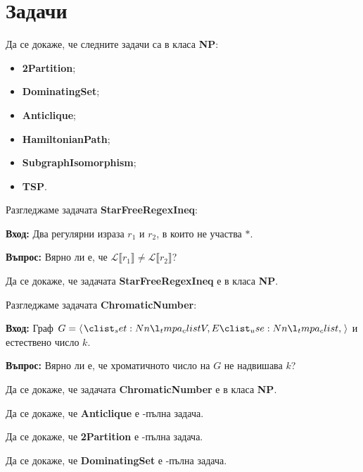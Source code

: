 \section{Задачи}

\begin{problem}
Да се докаже, че следните задачи са в класа \textbf{NP}:
\begin{itemize}
    \item \textbf{2Partition};
    \item \textbf{DominatingSet};
    \item \textbf{Anticlique};
    \item \textbf{HamiltonianPath};
    \item \textbf{SubgraphIsomorphism};
    \item \textbf{TSP}.
\end{itemize}
\end{problem}

\begin{problem}
Разгледжаме задачата \textbf{StarFreeRegexIneq}:

\vspace*{2mm}
\textbf{Вход:} Два регулярни израза $r_1$ и $r_2$, в които не участва $*$.

\textbf{Въпрос:} Вярно ли е, че $\mathcal{L}\llbracket r_1 \rrbracket \neq \mathcal{L}\llbracket r_2 \rrbracket$?
\vspace*{2mm}

Да се докаже, че задачата \textbf{StarFreeRegexIneq} е в класа \textbf{NP}.
\end{problem}

\begin{problem}
Разгледжаме задачата \textbf{ChromaticNumber}:

\vspace*{2mm}
\textbf{Вход:} Граф $G = \opair{V, E}$ и естествено число $k$.

\textbf{Въпрос:} Вярно ли е, че хроматичното число на $G$ не надвишава $k$?
\vspace*{2mm}

Да се докаже, че задачата \textbf{ChromaticNumber} е в класа \textbf{NP}.
\end{problem}

\begin{problem}
Да се докаже, че \textbf{Anticlique} е \NP-пълна задача.
\end{problem}

\begin{problem}
Да се докаже, че \textbf{2Partition} е \NP-пълна задача.
\end{problem}

\begin{problem}
Да се докаже, че \textbf{DominatingSet} е \NP-пълна задача.
\end{problem}